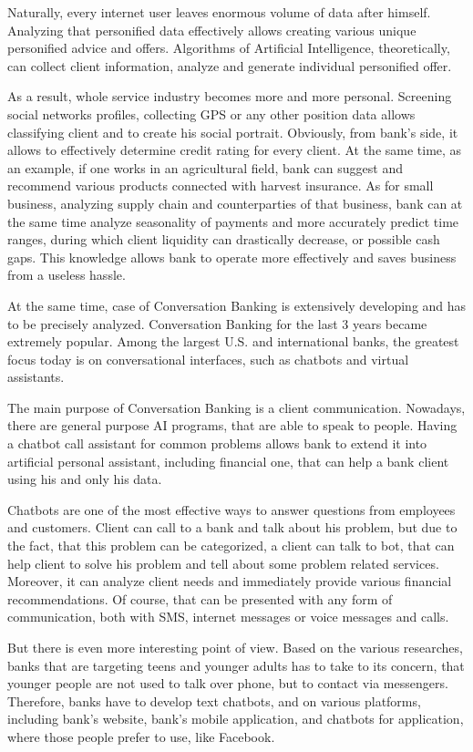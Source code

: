 Naturally, every internet user leaves enormous volume of data after himself.
Analyzing that personified data effectively allows creating various unique personified advice and offers.
Algorithms of Artificial Intelligence, theoretically, can collect client information, analyze and generate individual personified offer.

As a result, whole service industry becomes more and more personal.
Screening social networks profiles, collecting GPS or any other position data allows classifying client and to create his social portrait.
Obviously, from bank's side, it allows to effectively determine credit rating for every client.
At the same time, as an example, if one works in an agricultural field, bank can suggest and recommend various products connected with harvest insurance.
As for small business, analyzing supply chain and counterparties of that business, bank can at the same time analyze seasonality of payments and more accurately predict time ranges, during which client liquidity can drastically decrease, or possible cash gaps.
This knowledge allows bank to operate more effectively and saves business from a useless hassle.

At the same time, case of Conversation Banking is extensively developing and has to be precisely analyzed.
Conversation Banking for the last 3 years became extremely popular.
Among the largest U.S. and international banks, the greatest focus today is on conversational interfaces, such as chatbots and virtual assistants.
\cite{deloitte_thriving_in_ai_era}

The main purpose of Conversation Banking is a client communication.
Nowadays, there are general purpose AI programs, that are able to speak to people.
Having a chatbot call assistant for common problems allows bank to extend it into artificial personal assistant, including financial one, that can help a bank client using his and only his data.

Chatbots are one of the most effective ways to answer questions from employees and customers.
Client can call to a bank and talk about his problem, but due to the fact, that this problem can be categorized, a client can talk to bot, that can help client to solve his problem and tell about some problem related services.
Moreover, it can analyze client needs and immediately provide various financial recommendations.
Of course, that can be presented with any form of communication, both with SMS, internet messages or voice messages and calls.

But there is even more interesting point of view.
Based on the various researches, banks that are targeting teens and younger adults has to take to its concern, that younger people are not used to talk over phone, but to contact via messengers. 
Therefore, banks have to develop text chatbots, and on various platforms, including bank's website, bank's mobile application, and chatbots for application, where those people prefer to use, like Facebook.

